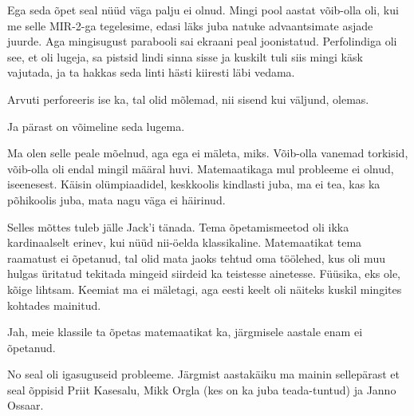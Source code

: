 
Ega seda õpet seal nüüd väga palju ei olnud. Mingi pool aastat võib-olla oli, 
kui me selle MIR-2-ga tegelesime, edasi läks juba natuke 
advaantsimate asjade juurde. Aga mingisugust parabooli sai ekraani peal 
joonistatud. Perfolindiga oli see, et  oli lugeja,  sa pistsid lindi sinna 
sisse ja kuskilt tuli siis mingi käsk vajutada, ja ta hakkas seda linti hästi 
kiiresti läbi vedama.


Arvuti perforeeris ise ka, tal olid mõlemad, nii sisend kui väljund, olemas.


Ja pärast on võimeline seda lugema. 


Ma olen selle peale mõelnud, aga ega  ei mäleta, miks. Võib-olla vanemad 
torkisid, võib-olla oli endal mingil määral huvi. Matemaatikaga mul probleeme 
ei olnud, iseenesest. Käisin olümpiaadidel, keskkoolis kindlasti juba, ma ei 
tea, kas ka põhikoolis juba, mata nagu väga ei häirinud.


Selles mõttes tuleb jälle Jack'i tänada. Tema õpetamismeetod 
oli ikka kardinaalselt erinev, kui nüüd nii-öelda klassikaline. Matemaatikat 
tema raamatust ei õpetanud, tal olid mata jaoks tehtud oma töölehed, kus oli 
muu hulgas üritatud tekitada mingeid siirdeid ka teistesse ainetesse. Füüsika, 
eks ole, kõige lihtsam. Keemiat ma ei mäletagi, aga eesti keelt oli näiteks 
kuskil mingites kohtades mainitud. 


Jah, meie klassile ta õpetas matemaatikat ka, järgmisele aastale enam ei 
õpetanud.  


No seal oli igasuguseid probleeme. Järgmist aastakäiku ma mainin sellepärast et 
seal õppisid Priit Kasesalu, Mikk 
Orgla (kes on ka juba teada-tuntud) ja Janno 
Ossaar. 

